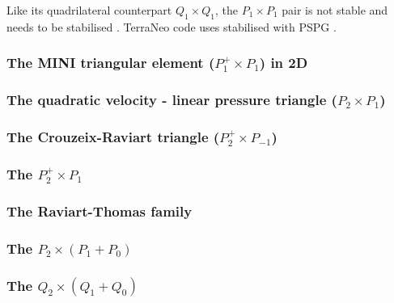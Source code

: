 Like its quadrilateral counterpart $Q_1\times Q_1$, the 
$P_1\times P_1$ pair is not stable and needs to be stabilised \cite{nosi98,tasu00}.
TerraNeo code uses stabilised with PSPG \cite{babd20}.

\subsubsection{The MINI triangular element ($P_1^+\times P_1$) in 2D \label{pair:mini}}


\subsubsection{The quadratic velocity - linear pressure triangle ($P_2\times P_1$) \label{ss:p2p1}}


\subsubsection{The Crouzeix-Raviart triangle ($P_2^+\times P_{-1}$)}
\label{sec:crouzeix-raviart}


\subsubsection{The $P_2^+\times P_{1}$ \label{ss:p2pp1}}


\subsubsection{The Raviart-Thomas family} \label{ss:raviart_thomas}



\subsubsection{The $P_2\times (P_1+P_0)$} \label{ss:p2p1p0}


\subsubsection{The $Q_2\times (Q_1+Q_0)$} \label{ss:q2q1q0}


